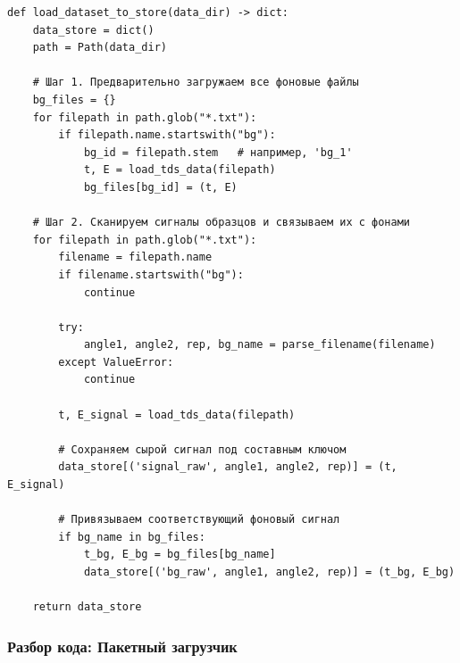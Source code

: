 \begin{listing}[H]
	\caption{Реляционная загрузка данных в базу ()}\label{lst:load_dataset}
	\begin{verbatim}
def load_dataset_to_store(data_dir) -> dict:
    data_store = dict()
    path = Path(data_dir)

    # Шаг 1. Предварительно загружаем все фоновые файлы
    bg_files = {}
    for filepath in path.glob("*.txt"):
        if filepath.name.startswith("bg"):
            bg_id = filepath.stem   # например, 'bg_1'
            t, E = load_tds_data(filepath)
            bg_files[bg_id] = (t, E)

    # Шаг 2. Сканируем сигналы образцов и связываем их с фонами
    for filepath in path.glob("*.txt"):
        filename = filepath.name
        if filename.startswith("bg"):
            continue

        try:
            angle1, angle2, rep, bg_name = parse_filename(filename)
        except ValueError:
            continue

        t, E_signal = load_tds_data(filepath)

        # Сохраняем сырой сигнал под составным ключом
        data_store[('signal_raw', angle1, angle2, rep)] = (t, E_signal)

        # Привязываем соответствующий фоновый сигнал
        if bg_name in bg_files:
            t_bg, E_bg = bg_files[bg_name]
            data_store[('bg_raw', angle1, angle2, rep)] = (t_bg, E_bg)

    return data_store
	\end{verbatim}
\end{listing}

\subsubsection{Разбор кода: Пакетный загрузчик}

